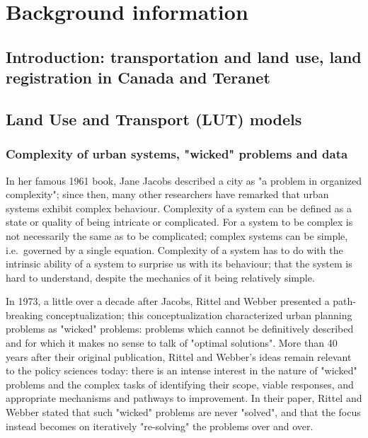 \chapter[Background information]{Background information} \label{ch:background}

\section{Introduction: transportation and land use, land registration in Canada and Teranet} \label{sec:intro_background}


\section{Land Use and Transport (LUT) models} \label{sec:evolution_of_models_of_urban_systems}

\subsection{Complexity of urban systems, "wicked" problems and data} \label{subsec:complexity_and_wicked_problems_and_data}

In her famous 1961 book, Jane Jacobs\cite{Jacobs1961} described a city as "a problem in organized complexity";
since then, many other researchers have remarked that urban systems exhibit complex behaviour\cite{Batty2008, Bettencourt2013}.
Complexity of a system can be defined as a state or quality of being intricate or complicated.
For a system to be complex is not necessarily the same as to be complicated;
complex systems can be simple, i.e.\ governed by a single equation.
Complexity of a system has to do with the intrinsic ability of a system to surprise us with its behaviour;
that the system is hard to understand, despite the mechanics of it being relatively simple.

In 1973, a little over a decade after Jacobs, Rittel and Webber\cite{Rittel1973} presented a path-breaking conceptualization;
this conceptualization characterized urban planning problems as "wicked" problems: problems which cannot be definitively described and for which it makes no sense to talk of "optimal solutions".
More than 40 years after their original publication, Rittel and Webber's ideas remain relevant to the policy sciences today: there is an intense interest in the nature of "wicked" problems and the complex tasks of identifying their scope, viable responses, and appropriate mechanisms and pathways to improvement\cite{Crowley2017}.
In their paper, Rittel and Webber stated that such "wicked" problems are never "solved", and that the focus instead becomes on iteratively "re-solving" the problems over and over.

